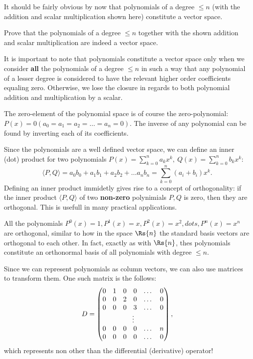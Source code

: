 It should be fairly obvious by now that polynomials of a degree $\leq n$ (with the addition and scalar multiplication shown here) constitute a vector space.
\begin{challange}
  Prove that the polynomials of a degree $\leq n$ together with the shown addition and scalar multiplication are indeed a vector space.
\end{challange}

\begin{warning}
  It is important to note that polynomials constitute a vector space only when we consider \textbf{all} the polynomials of a degree $\leq n$ in such a way that any polynomial of a lesser degree is considered to have the relevant higher order coefficients equaling zero. Otherwise, we lose the closure in regards to both polynomial addition and multiplication by a scalar.
\end{warning}

The zero-element of the polynomial space is of course the zero-polynomial: $P(x)=0 (a_{0}=a_{1}=a_{2}=\dots=a_{n}=0)$. The inverse of any polynomial can be found by inverting each of its coefficients.

Since the polynomials are a well defined vector space, we can define an inner (dot) product for two polynomials $P(x)=\sum\limits_{k=0}^{n}a_{k}x^{k},\ Q(x)=\sum\limits_{k=0}^{n}b_{k}x^{k}$:
\begin{equation*}
  \langle P, Q \rangle = a_{0}b_{0} + a_{1}b_{1} + a_{2}b_{2} + \dots a_{n}b_{n} = \sum\limits_{k=0}^{n}\left(a_{i}+b_{i}\right)x^{k}.
\end{equation*}
Defining an inner product immidetly gives rise to a concept of orthogonality: if the inner product $\langle P, Q\rangle$ of two \textbf{non-zero} polynimials $P,Q$ is zero, then they are orthogonal. This is usefull in many practical applications.
\begin{example}
  All the polynomials $P^{0}(x) = 1, P^{1}(x)=x, P^{2}(x)=x^{2}, dots, P^{n}(x)=x^{n}$ are orthogonal, similar to how in the space $\Rs{n}$ the standard basis vectors are orthogonal to each other.
  In fact, exactly as with $\Rs{n}$, thes polynomials constitute an orthonormal basis of all polynomials with degree $\leq n$.
\end{example}

Since we can represent polynomials as column vectors, we can also use matrices to transform them. One such matrix is the follows:
\begin{equation*}
  D=\begin{pmatrix}
      0 & 1 & 0 & 0 & \dots & 0\\
      0 & 0 & 2 & 0 & \dots & 0\\
      0 & 0 & 0 & 3 & \dots & 0\\
      \multicolumn{6}{c}{\vdots}\\
      0 & 0 & 0 & 0 & \dots & n\\
      0 & 0 & 0 & 0 & \dots & 0\\
    \end{pmatrix},
\end{equation*}
which represents non other than the differential (derivative) operator!


